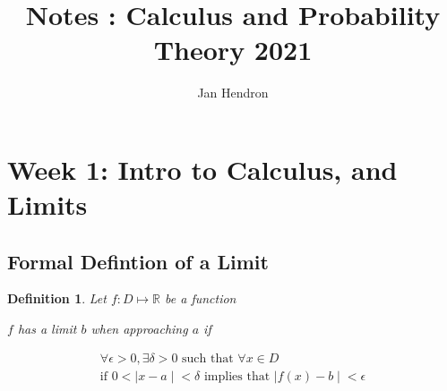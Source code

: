 \documentclass[10pt,a4paper]{article}
\title{Notes : Calculus and Probability Theory 2021}
\author{Jan Hendron}
\newcommand{\abs}[1]{\ensuremath{\mid #1\mid}}
\newtheorem{definition}{Definition}
\begin{document}
\maketitle

\section*{Week 1: Intro to Calculus, and Limits}
\subsection*{Formal Defintion of a Limit}
\begin{definition}
Let $f : D \mapsto \mathbb{R}$  be a function

$f$ has a limit $b$ when approaching $a$ if

\begin{gather}
\forall \epsilon > 0 , \exists \delta > 0 \textrm{ such that } \forall x \in D \\
  \textrm{if } 0 <  \abs{x - a} < \delta \textrm{ implies that } \abs{f(x) - b} < \epsilon
\end{gather}
\end{definition}
\end{document}

